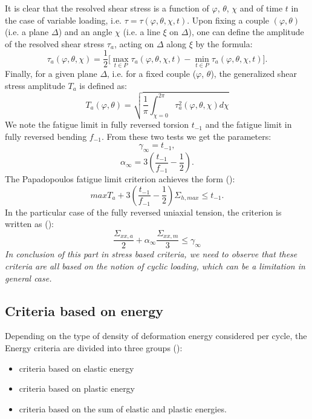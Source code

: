 It is clear that the resolved shear stress is a function of
$\varphi$, $\theta$, $\chi$ and of time $t$ in the case of variable loading, i.e. $\tau=\tau(\varphi, \theta, \chi, t)$. Upon fixing a couple $(\varphi, \theta)$ (i.e. a plane
$\Delta$) and an angle $\chi$ (i.e. a line $\xi$ on $\Delta$), one can define the amplitude of the resolved shear stress $\tau_a$, acting on $\Delta$
along $\xi$ by the formula:
\begin{equation}
\tau_a(\varphi,\theta,\chi)=\frac{1}{2}\big[\max \limits_{t\in P}\tau_a(\varphi,\theta,\chi ,t)-\min \limits_{t\in P}\tau_a(\varphi,\theta,\chi ,t)\big].
\end{equation}
Finally, for a given plane $\Delta$, i.e. for a fixed couple ($\varphi$, $\theta$),
the generalized shear stress amplitude $T_a$ is defined as:
\begin{equation}
T_a(\varphi,\theta)=\sqrt{\frac{1}{\pi}\int_{\chi=0}^{2\pi} \tau_a^2(\varphi,\theta,\chi)d\chi}
\label{Ta}
\end{equation}
We note the fatigue limit in fully reversed torsion $t_{-1}$ and the fatigue limit in fully reversed bending $f_{-1}$. From these two tests we get the parameters:
$$\gamma_\infty=t_{-1},$$ 
$$\alpha_\infty=3\left( \frac{t_{-1}}{f_{-1}}-\frac{1}{2}\right) .$$
The Papadopoulos fatigue limit criterion achieves the form (\cite{papadopoulos2001long}):
\begin{equation}
maxT_a+3\left( \frac{t_{-1}}{f_{-1}}-\frac{1}{2}\right) \Sigma_{h,max}\leqslant t_{-1}.
\label{eq:papadopoulos}
\end{equation}
In the particular case of the fully reversed uniaxial tension, the criterion is written as (\cite{papadopoulos2001long}):
$$\dfrac{\Sigma_{xx,a}}{2}+\alpha_\infty\dfrac{\Sigma_{xx,m}}{3} \leqslant\gamma_\infty$$
\textit{In conclusion of this part in stress based criteria, we need to observe that these criteria are all based on the notion of cyclic loading, which can be a limitation in general case.}
\subsection{Criteria based on energy}
Depending on the type of density of deformation energy considered per cycle, the
Energy criteria are divided into three groups (\cite{macha1999energy}):
\begin{itemize}
	\item  criteria based on elastic energy
	\item  criteria based on plastic energy
	\item  criteria based on the sum of elastic and plastic energies.
\end{itemize}

